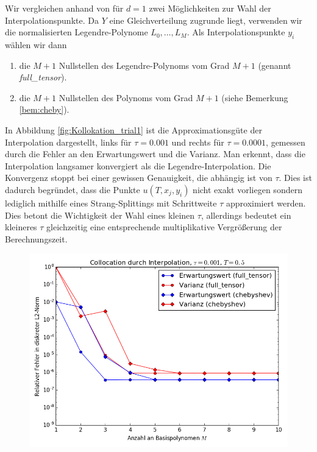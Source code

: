 \begin{mathbsp}
Wir vergleichen anhand von  für $d=1$ zwei Möglichkeiten zur Wahl der Interpolationspunkte. Da $Y$ eine Gleichverteilung zugrunde liegt, verwenden wir die normalisierten Legendre-Polynome $L_0,\dots,L_M$. Als Interpolationspunkte $y_i$ wählen wir dann
\begin{enumerate}
\item die $M+1$ Nullstellen des Legendre-Polynoms vom Grad $M+1$ (genannt \textit{full\_tensor}).
\item die $M+1$ Nullstellen des \chebyspace Polynoms vom Grad $M+1$ (siehe Bemerkung \ref{bem:cheby}).
\end{enumerate}
In Abbildung \ref{fig:Kollokation_trial1} ist die Approximationsgüte der Interpolation dargestellt, links für $\tau=0.001$ und rechts für $\tau=0.0001$, gemessen durch die Fehler an den Erwartungswert und die Varianz. Man erkennt, dass die \chebyspace Interpolation langsamer konvergiert als die Legendre-Interpolation. Die Konvergenz stoppt bei einer gewissen Genauigkeit, die abhängig ist von $\tau$. Dies ist dadurch begründet, dass die Punkte $u(T,x_j,y_i)$ nicht exakt vorliegen sondern lediglich mithilfe eines Strang-Splittings mit Schrittweite $\tau$ approximiert werden. Dies betont die Wichtigkeit der Wahl eines kleinen $\tau$, allerdings bedeutet ein kleineres $\tau$ gleichzeitig eine entsprechende multiplikative Vergrößerung der Berechnungszeit.
\begin{figure}[!htb]
  \includegraphics[width=\linewidth]{Figures/collocation_mi_trial1_tau001.png}
\endminipage
{}

\end{figure}
\end{mathbsp}
